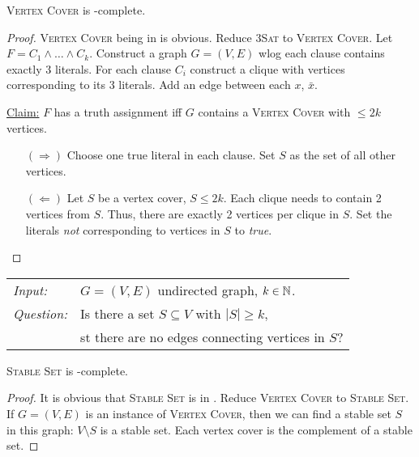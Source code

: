 \documentclass[../skript.tex]{subfiles}
\begin{document}
\begin{theorem} %
\label{thm:8}
\textsc{Vertex Cover} is \NP-complete.
\end{theorem}
\begin{proof}
\textsc{Vertex Cover} being in \NP{} is obvious.
Reduce \textsc{3Sat} to \textsc{Vertex Cover}.
Let $F = C_1 \wedge \ldots \wedge C_k$. Construct a graph $G = (V, E)$
\Ac{wlog} each clause contains exactly 3 literals.
For each clause $C_i$ construct a clique with vertices corresponding to its 3 literals.
Add an edge between each $x$, $\bar{x}$.

\underline{Claim:} $F$ has a truth assignment \ac{iff} $G$ contains a \textsc{Vertex Cover} with $\leq 2k$ vertices.
\begin{itemize}
\item[$(\Rightarrow)$] Choose one true literal in each clause. Set $S$ as the set of all other vertices.
\item[$(\Leftarrow)$] Let $S$ be a vertex cover, $S \leq 2k$. Each clique needs to contain 2 vertices from $S$. Thus, there are exactly 2 vertices per clique in $S$.
Set the literals \emph{not} corresponding to vertices in $S$ to \textit{true}.
\end{itemize}
\end{proof}
\begin{problem}
\begin{tabular}{ll}
\textit{Input:} & $G = (V, E)$ undirected graph, $k \in \mathbb{N}$. \\
\textit{Question:} & Is there a set $S \subseteq V$ with $|S| \geq k$, \\
& \ac{st} there are no edges connecting vertices in $S$?
\end{tabular}
\end{problem}
\begin{theorem} %
\label{thm:9}
\textsc{Stable Set} is \NP-complete.
\end{theorem}
\begin{proof}
It is obvious that \textsc{Stable Set} is in \NP.
Reduce \textsc{Vertex Cover} to \textsc{Stable Set}.
If $G = (V, E)$ is an instance of \textsc{Vertex Cover}, then we can find a stable set $S$ in this graph: $V \setminus S$ is a stable set.
Each vertex cover is the complement of a stable set.
\end{proof}
\end{document}
